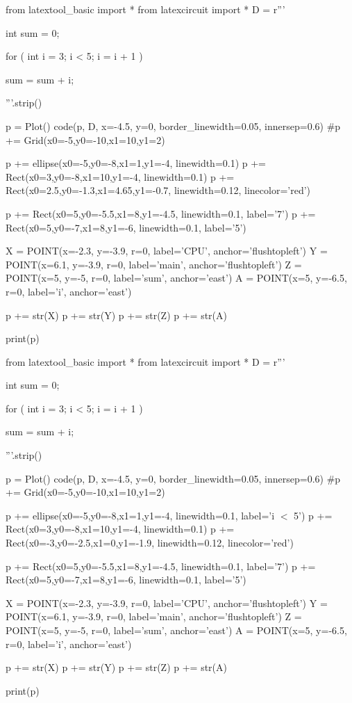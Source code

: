 \begin{python}
from latextool_basic import *
from latexcircuit import *
D = r'''



int sum = 0;

    for ( int i = 3;     i < 5;     i = i + 1 )


        sum = sum + i;



'''.strip()

p = Plot()
code(p, D, x=-4.5, y=0, border_linewidth=0.05, innersep=0.6)
#p += Grid(x0=-5,y0=-10,x1=10,y1=2)

p += ellipse(x0=-5,y0=-8,x1=1,y1=-4, linewidth=0.1)
p += Rect(x0=3,y0=-8,x1=10,y1=-4, linewidth=0.1)
p += Rect(x0=2.5,y0=-1.3,x1=4.65,y1=-0.7, linewidth=0.12, linecolor='red')

p += Rect(x0=5,y0=-5.5,x1=8,y1=-4.5, linewidth=0.1, label='7')
p += Rect(x0=5,y0=-7,x1=8,y1=-6, linewidth=0.1, label='5')

X = POINT(x=-2.3, y=-3.9, r=0, label='CPU', anchor='flushtopleft')
Y = POINT(x=6.1, y=-3.9, r=0, label='main', anchor='flushtopleft')
Z = POINT(x=5, y=-5, r=0, label='sum', anchor='east')
A = POINT(x=5, y=-6.5, r=0, label='i', anchor='east')

p += str(X)
p += str(Y)
p += str(Z)
p += str(A)

print(p)
\end{python}

\begin{python}
from latextool_basic import *
from latexcircuit import *
D = r'''



int sum = 0;

    for ( int i = 3;     i < 5;     i = i + 1 )


        sum = sum + i;



'''.strip()

p = Plot()
code(p, D, x=-4.5, y=0, border_linewidth=0.05, innersep=0.6)
#p += Grid(x0=-5,y0=-10,x1=10,y1=2)

p += ellipse(x0=-5,y0=-8,x1=1,y1=-4, linewidth=0.1, label='i $<$ 5')
p += Rect(x0=3,y0=-8,x1=10,y1=-4, linewidth=0.1)
p += Rect(x0=-3,y0=-2.5,x1=0,y1=-1.9, linewidth=0.12, linecolor='red')

p += Rect(x0=5,y0=-5.5,x1=8,y1=-4.5, linewidth=0.1, label='7')
p += Rect(x0=5,y0=-7,x1=8,y1=-6, linewidth=0.1, label='5')

X = POINT(x=-2.3, y=-3.9, r=0, label='CPU', anchor='flushtopleft')
Y = POINT(x=6.1, y=-3.9, r=0, label='main', anchor='flushtopleft')
Z = POINT(x=5, y=-5, r=0, label='sum', anchor='east')
A = POINT(x=5, y=-6.5, r=0, label='i', anchor='east')

p += str(X)
p += str(Y)
p += str(Z)
p += str(A)

print(p)
\end{python}

